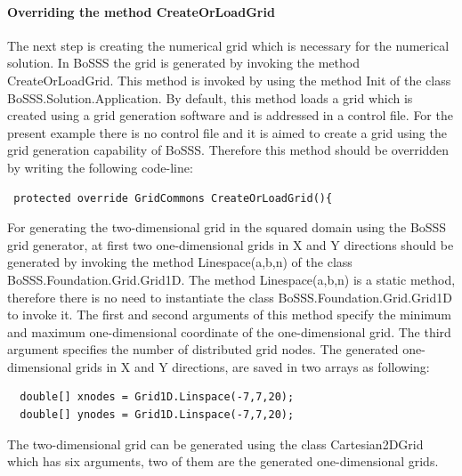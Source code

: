\documentclass[11pt,twoside,a4paper]{fdyartcl}
\begin{document}
\paragraph{Overriding the method {\scriptsize CreateOrLoadGrid}}
The next step is creating the numerical grid which is necessary for the numerical solution. In BoSSS the grid is generated by invoking the method {\scriptsize CreateOrLoadGrid}. This method is invoked by using the method {\scriptsize Init} of the class {\scriptsize BoSSS.Solution.Application}. By default, this method loads a grid which is created using a grid generation software and is addressed in a control file. For the present example there is no control file and it is aimed to create a grid using the grid generation capability of BoSSS. Therefore this method should be overridden by writing the following code-line:
{\scriptsize \begin{verbatim}
 protected override GridCommons CreateOrLoadGrid(){
\end{verbatim}}
For generating the two-dimensional grid in the squared domain using the BoSSS grid generator, at first two one-dimensional grids in X and Y directions should be generated by invoking the method {\scriptsize Linespace(a,b,n)} of the class {\scriptsize BoSSS.Foundation.Grid.Grid1D}. The method {\scriptsize Linespace(a,b,n)} is a static method, therefore there is no need to instantiate the class {\scriptsize BoSSS.Foundation.Grid.Grid1D} to invoke it. The first and second arguments of this method specify the minimum and maximum one-dimensional coordinate of the one-dimensional grid. The third argument specifies the number of distributed grid nodes. The generated one-dimensional grids in X and Y directions, are saved in two arrays as following:
{\scriptsize \begin{verbatim}
  double[] xnodes = Grid1D.Linspace(-7,7,20);
  double[] ynodes = Grid1D.Linspace(-7,7,20);
\end{verbatim}}
The two-dimensional grid can be generated using the class {\scriptsize Cartesian2DGrid} which has six arguments, two of them are the generated one-dimensional grids.
\end{document}
